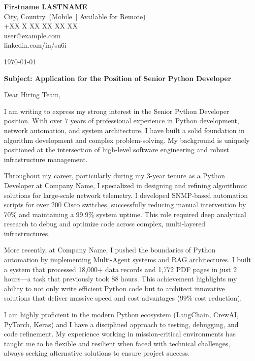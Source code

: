 \documentclass[11pt,a4paper]{article}
\makeatletter
\providecommand{\cvname}{Firstname LASTNAME}
\providecommand{\cvemail}{user@example.com}
\providecommand{\cvphone}{+XX X XX XX XX XX}
\providecommand{\cvlocation}{City, Country}
\providecommand{\cvmobility}{Mobile}
\newcommand{\PositionTitle}{Senior Python Developer}
\makeatother
\begin{document}
\begin{minipage}[t]{\textwidth}
\RaggedRight
\textbf{\large \cvname} \\
\cvlocation\ (\cvmobility\ | Available for Remote) \\
\cvphone \\
\cvemail \\
linkedin.com/in/su6i \\
\end{minipage}

\vspace{1cm}

\begin{flushright}
  \today
\end{flushright}

\vspace{0.5cm}

\textbf{Subject: Application for the Position of \PositionTitle}

\vspace{0.5cm}

Dear Hiring Team,

I am writing to express my strong interest in the \PositionTitle{} position. With over 7 years of professional experience in Python development, network automation, and system architecture, I have built a solid foundation in algorithm development and complex problem-solving. My background is uniquely positioned at the intersection of high-level software engineering and robust infrastructure management.

Throughout my career, particularly during my 3-year tenure as a Python Developer at Company Name, I specialized in designing and refining algorithmic solutions for large-scale network telemetry. I developed SNMP-based automation scripts for over 200 Cisco switches, successfully reducing manual intervention by 70\% and maintaining a 99.9\% system uptime. This role required deep analytical research to debug and optimize code across complex, multi-layered infrastructures.

More recently, at Company Name, I pushed the boundaries of Python automation by implementing Multi-Agent systems and RAG architectures. I built a system that processed 18,000+ data records and 1,772 PDF pages in just 2 hours—a task that previously took 88 hours. This achievement highlights my ability to not only write efficient Python code but to architect innovative solutions that deliver massive speed and cost advantages (99\% cost reduction).

I am highly proficient in the modern Python ecosystem (LangChain, CrewAI, PyTorch, Keras) and I have a disciplined approach to testing, debugging, and code refinement. My experience working in mission-critical environments has taught me to be flexible and resilient when faced with technical challenges, always seeking alternative solutions to ensure project success.
\end{document}

